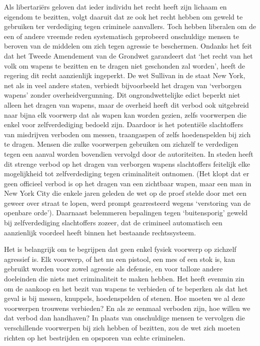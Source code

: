 \documentclass[
  a5paper,
  smalldemyvopaper,10pt,twoside,onecolumn,openright,extrafontsizes,hidelinks]{memoir}
\begin{document}
Als libertariërs geloven dat ieder individu het recht heeft zijn lichaam
en eigendom te bezitten, volgt daaruit dat ze ook het recht hebben om
geweld te gebruiken ter verdediging tegen criminele aanvallers. Toch
hebben liberalen om de een of andere vreemde reden systematisch
geprobeerd onschuldige mensen te beroven van de middelen om zich tegen
agressie te beschermen. Ondanks het feit dat het Tweede Amendement van
de Grondwet garandeert dat `het recht van het volk om wapens te bezitten
en te dragen niet geschonden zal worden', heeft de regering dit recht
aanzienlijk ingeperkt. De wet Sullivan in de staat New York, net als in
veel andere staten, verbiedt bijvoorbeeld het dragen van `verborgen
wapens' zonder overheidvergunning. Dit ongrondwettelijke edict beperkt
niet alleen het dragen van wapens, maar de overheid heeft dit verbod ook
uitgebreid naar bijna elk voorwerp dat als wapen kan worden gezien,
zelfs voorwerpen die enkel voor zelfverdediging bedoeld zijn. Daardoor
is het potentiële slachtoffers van misdrijven verboden om messen,
traangaspen of zelfs hoedenspelden bij zich te dragen. Mensen die zulke
voorwerpen gebruiken om zichzelf te verdedigen tegen een aanval worden
bovendien vervolgd door de autoriteiten. In steden heeft dit strenge
verbod op het dragen van verborgen wapens slachtoffers feitelijk elke
mogelijkheid tot zelfverdediging tegen criminaliteit ontnomen. (Het
klopt dat er geen officieel verbod is op het dragen van een zichtbaar
wapen, maar een man in New York City die enkele jaren geleden de wet op
de proef stelde door met een geweer over straat te lopen, werd prompt
gearresteerd wegens `verstoring van de openbare orde'). Daarnaast
belemmeren bepalingen tegen `buitensporig' geweld bij zelfverdediging
slachtoffers zozeer, dat de crimineel automatisch een aanzienlijk
voordeel heeft binnen het bestaande rechtssysteem.

Het is belangrijk om te begrijpen dat geen enkel fysiek voorwerp op
zichzelf agressief is. Elk voorwerp, of het nu een pistool, een mes of
een stok is, kan gebruikt worden voor zowel agressie als defensie, en
voor talloze andere doeleinden die niets met criminaliteit te maken
hebben. Het heeft evenmin zin om de aankoop en het bezit van wapens te
verbieden of te beperken als dat het geval is bij messen, knuppels,
hoedenspelden of stenen. Hoe moeten we al deze voorwerpen trouwens
verbieden? En als ze eenmaal verboden zijn, hoe willen we dat verbod dan
handhaven? In plaats van onschuldige mensen te vervolgen die
verschillende voorwerpen bij zich hebben of bezitten, zou de wet zich
moeten richten op het bestrijden en opsporen van echte criminelen.
\end{document}
